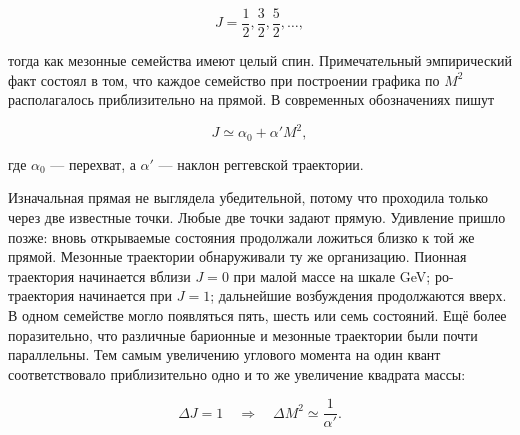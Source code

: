 \begin{equation}
  J=\frac12,\frac32,\frac52,\ldots,
\end{equation}

тогда как мезонные семейства имеют целый спин. Примечательный эмпирический факт состоял
в том, что каждое семейство при построении графика по \(M^2\) располагалось приблизительно
на прямой. В современных обозначениях пишут

\begin{equation}
  J\simeq \alpha_0+\alpha' M^2,
  \label{eq:l01-regge-trajectory}
\end{equation}

где \(\alpha_0\) — перехват, а \(\alpha'\) — наклон реггевской траектории.

Изначальная прямая не выглядела убедительной, потому что проходила только
через две известные точки. Любые две точки задают прямую. Удивление пришло позже:
вновь открываемые состояния продолжали ложиться близко к той же прямой. Мезонные
траектории обнаруживали ту же организацию. Пионная траектория начинается вблизи \(J=0\) при
малой массе на шкале GeV; ро-траектория начинается при \(J=1\); дальнейшие возбуждения
продолжаются вверх. В одном семействе могло появляться пять, шесть или семь состояний. Ещё
более поразительно, что различные барионные и мезонные траектории были почти
параллельны. Тем самым увеличению углового момента на один квант соответствовало
приблизительно одно и то же увеличение квадрата массы:

\begin{equation}
  \Delta J=1
  \quad\Longrightarrow\quad
  \Delta M^2\simeq \frac{1}{\alpha'}.
  \label{eq:l01-regge-spacing}
\end{equation}

\begin{classroomqa}
\end{classroomqa}

